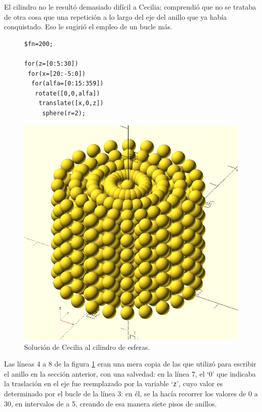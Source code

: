 El cilindro no le resultó demasiado difícil a Cecilia; comprendió que
no se trataba de otra cosa que una repetición a lo largo del eje
 del anillo que ya había conquistado. Eso le sugirió el
empleo de un bucle más.


  \begin{figure}[ht]
  \begin{minipage}[]{.5\textwidth}
    \begin{lstlisting}
$fn=200;

for(z=[0:5:30])
 for(x=[20:-5:0])
  for(alfa=[0:15:359])
   rotate([0,0,alfa])
    translate([x,0,z])
     sphere(r=2);
    \end{lstlisting}%
  \end{minipage}\hfill
    \begin{minipage}[]{.5\textwidth}
      \centering
      \includegraphics[width=\textwidth]{imagenes/cilindro-de-esferas}
    \end{minipage}
    \caption{Solución de Cecilia al cilindro de esferas.}
    \label{fig:cilindro-de-esferas}
  \end{figure}


  Las líneas 4 a 8 de la figura \ref{fig:cilindro-de-esferas} eran una
  mera copia de las que utilizó para escribir el anillo en la sección
  anterior, con una salvedad: en la línea 7, el `0' que indicaba la
  traslación en el eje  fue reemplazado por la variable
  `\texttt{z}', cuyo valor es determinado por el bucle de la línea 3:
  en él, se la hacía recorrer los valores de 0 a 30, en intervalos de
  a 5, creando de esa manera siete pisos de anillos.

